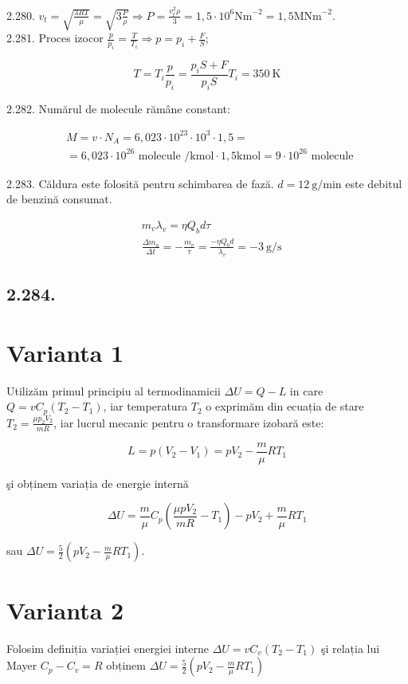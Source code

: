 \documentclass[10pt]{article}
\begin{document}
2.280. $v_{t}=\sqrt{\frac{3 R T}{\mu}}=\sqrt{3 \frac{P}{\rho}} \Rightarrow P=\frac{v_{t}^{2} \rho}{3}=1,5 \cdot 10^{6} \mathrm{Nm}^{-2}=1,5 \mathrm{MNm}^{-2}$.\\
2.281. Proces izocor $\frac{p}{p_{i}}=\frac{T}{T_{i}} \Rightarrow p=p_{i}+\frac{F}{S}$;

$$
T=T_{i} \frac{p}{p_{i}}=\frac{p_{i} S+F}{p_{i} S} T_{i}=350 \mathrm{~K}
$$

2.282. Numărul de molecule rămâne constant:

$$
\begin{aligned}
& M=v \cdot N_{A}=6,023 \cdot 10^{23} \cdot 10^{3} \cdot 1,5= \\
& =6,023 \cdot 10^{26} \text { molecule } / \mathrm{kmol} \cdot 1,5 \mathrm{kmol}=9 \cdot 10^{26} \text { molecule }
\end{aligned}
$$

2.283. Căldura este folosită pentru schimbarea de fază. $d=12 \mathrm{~g} / \mathrm{min}$ este debitul de benzină consumat.

$$
\begin{aligned}
& m_{v} \lambda_{v}=\eta Q_{b} d \tau \\
& \frac{\Delta m_{a}}{\Delta t}=-\frac{m_{v}}{\tau}=\frac{-\eta Q_{b} d}{\lambda_{v}}=-3 \mathrm{~g} / \mathrm{s}
\end{aligned}
$$

\subsection*{2.284.}
\section*{Varianta 1}
Utilizăm primul principiu al termodinamicii $\Delta U=Q-L$ in care $Q=v C_{p}\left(T_{2}-T_{1}\right)$, iar temperatura $T_{2}$ o exprimăm din ecuația de stare $T_{2}=\frac{\mu p_{2} V_{2}}{m R}$, iar lucrul mecanic pentru o transformare izobară este:

$$
L=p\left(V_{2}-V_{1}\right)=p V_{2}-\frac{m}{\mu} R T_{1}
$$

şi obținem variația de energie internă

$$
\Delta U=\frac{m}{\mu} C_{p}\left(\frac{\mu p V_{2}}{m R}-T_{1}\right)-p V_{2}+\frac{m}{\mu} R T_{1}
$$

sau $\Delta U=\frac{5}{2}\left(p V_{2}-\frac{m}{\mu} R T_{1}\right)$.

\section*{Varianta 2}
Folosim definiția variației energiei interne $\Delta U=v C_{v}\left(T_{2}-T_{1}\right)$ şi relația lui Mayer $C_{p}-C_{v}=R$ obținem $\Delta U=\frac{5}{2}\left(p V_{2}-\frac{m}{\mu} R T_{1}\right)$
\end{document}
